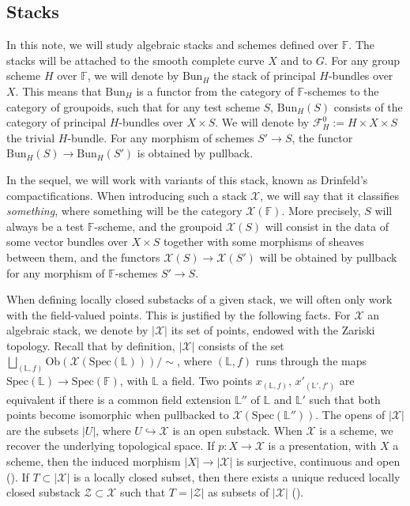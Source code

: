 \documentclass[11pt]{amsart}
\theoremstyle{plain}
\theoremstyle{remark}
\numberwithin{equation}{section}
\begin{document}
	\subsection{Stacks}
	In this note, we will study algebraic stacks and schemes defined over $\mathbb{F}$. The stacks will be attached to the smooth complete curve $X$ and to $G$.  For any group scheme $H$ over $\mathbb{F}$, we will denote by $\mathrm{Bun}_H$ the stack of principal $H$-bundles over $X$. This means that $\mathrm{Bun}_H$ is a functor from the category of $\mathbb{F}$-schemes to the category of groupoids, such that for any test scheme $S$, $\mathrm{Bun}_H(S)$ consists of the category of principal $H$-bundles over $X\times S$. We will denote by $\mathcal{F}^0_H:=H\times X\times S$ the trivial $H$-bundle. For any morphism of schemes $S'\to S$, the functor $\mathrm{Bun}_H(S)\to \mathrm{Bun}_H(S')$ is obtained by pullback. 
	
	In the sequel, we will work with variants of this stack, known as Drinfeld's compactifications. When introducing such a stack $\mathcal{X}$, we will say that it classifies \textit{something}, where something will be the category $\mathcal{X}(\mathbb{F})$. More precisely, $S$ will always be a test $\mathbb{F}$-scheme, and the groupoid $\mathcal{X}(S)$ will consist in the data of some vector bundles over $X\times S$ together with some morphisms of sheaves between them, and the functors $\mathcal{X}(S)\to \mathcal{X}(S')$ will be obtained by pullback for any morphism of $\mathbb{F}$-schemes $S'\to S$.
	
	When defining locally closed substacks of a given stack, we will often only work with the field-valued points. This is justified by the following facts. For $\mathcal{X}$ an algebraic stack, we denote by $|\mathcal{X}|$ its set of points, endowed with the Zariski topology. Recall that by definition, $|\mathcal{X}|$ consists of the set $\bigsqcup_{(\mathbb{L},f)}\mathrm{Ob}(\mathcal{X}(\mathrm{Spec}(\mathbb{L})))/\sim$, where $(\mathbb{L},f)$ runs through the maps $\mathrm{Spec}(\mathbb{L})\to \mathrm{Spec}(\mathbb{F})$, with $\mathbb{L}$ a field. Two points $x_{(\mathbb{L},f)}$, $x'_{(\mathbb{L}',f')}$ are equivalent if there is a common field extension $\mathbb{L}''$ of $\mathbb{L}$ and $\mathbb{L}'$ such that both points become isomorphic when pullbacked to $\mathcal{X}(\mathrm{Spec}(\mathbb{L}''))$. The opens of $|\mathcal{X}|$ are the subsets $|U|$, where $U\hookrightarrow\mathcal{X}$ is an open substack.  When $\mathcal{X}$ is a scheme, we recover the underlying topological space. If $p:X\to \mathcal{X}$ is a presentation, with $X$ a scheme, then the induced morphism $|X|\to |\mathcal{X}|$ is surjective, continuous and open (\cite[§ 100.4]{stacks-project}). If $T\subset|\mathcal{X}|$ is a locally closed subset, then there exists a unique reduced locally closed substack $\mathcal{Z}\subset\mathcal{X}$ such that $T=|\mathcal{Z}|$ as subsets of $|\mathcal{X}|$ (\cite[Remark 100.10.5]{stacks-project}).
	
\end{document}
